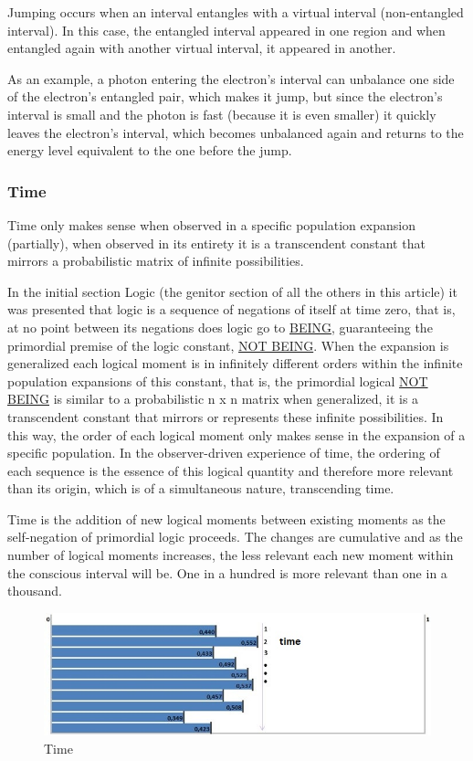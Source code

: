 Jumping occurs when an interval entangles with a virtual interval (non-entangled interval). In this case, the entangled interval appeared in one region and when entangled again with another virtual interval, it appeared in another.

As an example, a photon entering the electron's interval can unbalance one side of the electron's entangled pair, which makes it jump, but since the electron's interval is small and the photon is fast (because it is even smaller) it quickly leaves the electron's interval, which becomes unbalanced again and returns to the energy level equivalent to the one before the jump.

\subsubsection{Time}
Time only makes sense when observed in a specific population expansion (partially), when observed in its entirety it is a transcendent constant that mirrors a probabilistic matrix of infinite possibilities.

In the initial section Logic (the genitor section of all the others in this article) it was presented that logic is a sequence of negations of itself at time zero, that is, at no point between its negations does logic go to \underline{BEING}, guaranteeing the primordial premise of the logic constant, \underline{NOT BEING}. When the expansion is generalized each logical moment is in infinitely different orders within the infinite population expansions of this constant, that is, the primordial logical \underline{NOT BEING} is similar to a probabilistic n x n matrix when generalized, it is a transcendent constant that mirrors or represents these infinite possibilities. In this way, the order of each logical moment only makes sense in the expansion of a specific population. In the observer-driven experience of time, the ordering of each sequence is the essence of this logical quantity and therefore more relevant than its origin, which is of a simultaneous nature, transcending time.

Time is the addition of new logical moments between existing moments as the self-negation of primordial logic proceeds. The changes are cumulative and as the number of logical moments increases, the less relevant each new moment within the conscious interval will be. One in a hundred is more relevant than one in a thousand. 
	\begin{figure}[H]
	\caption{Time}
	\label{fig:consciousness_time}
	\centering
	\includegraphics[scale=.8]{sections/images/consciousness_time.jpg}
	\end{figure}

